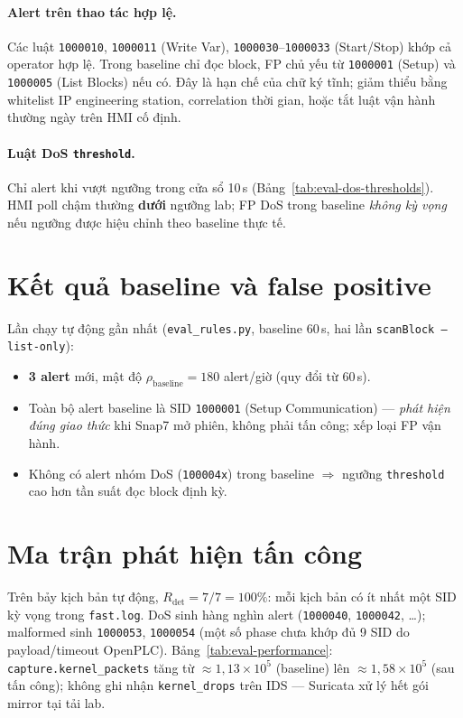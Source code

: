 \documentclass[../main.tex]{subfiles}
\begin{document}
\paragraph{Alert trên thao tác hợp lệ.}
Các luật \texttt{1000010}, \texttt{1000011} (Write Var), \texttt{1000030}--\texttt{1000033} (Start/Stop) khớp cả operator hợp lệ. Trong baseline chỉ đọc block, FP chủ yếu từ \texttt{1000001} (Setup) và \texttt{1000005} (List Blocks) nếu có. Đây là hạn chế của chữ ký tĩnh; giảm thiểu bằng whitelist IP engineering station, correlation thời gian, hoặc tắt luật vận hành thường ngày trên HMI cố định.

\paragraph{Luật DoS \texttt{threshold}.}
Chỉ alert khi vượt ngưỡng trong cửa sổ 10\,s (Bảng~\ref{tab:eval-dos-thresholds}). HMI poll chậm thường \textbf{dưới} ngưỡng lab; FP DoS trong baseline \emph{không kỳ vọng} nếu ngưỡng được hiệu chỉnh theo baseline thực tế.

\section{Kết quả baseline và false positive}
\label{sec:eval-fp}

Lần chạy tự động gần nhất (\texttt{eval\_rules.py}, baseline 60\,s, hai lần \texttt{scanBlock --list-only}):
\begin{itemize}
    \item \textbf{3 alert} mới, mật độ $\rho_{\mathrm{baseline}} = 180$ alert/giờ (quy đổi từ 60\,s).
    \item Toàn bộ alert baseline là SID \texttt{1000001} (Setup Communication) --- \emph{phát hiện đúng giao thức} khi Snap7 mở phiên, không phải tấn công; xếp loại FP vận hành.
    \item Không có alert nhóm DoS (\texttt{100004x}) trong baseline $\Rightarrow$ ngưỡng \texttt{threshold} cao hơn tần suất đọc block định kỳ.
\end{itemize}

\section{Ma trận phát hiện tấn công}
\label{sec:eval-detection}

Trên bảy kịch bản tự động, \textbf{$R_{\mathrm{det}} = 7/7 = 100\%$}: mỗi kịch bản có ít nhất một SID kỳ vọng trong \texttt{fast.log}. DoS sinh hàng nghìn alert (\texttt{1000040}, \texttt{1000042}, \ldots); malformed sinh \texttt{1000053}, \texttt{1000054} (một số phase chưa khớp đủ 9 SID do payload/timeout OpenPLC). Bảng~\ref{tab:eval-performance}: \texttt{capture.kernel\_packets} tăng từ $\approx 1{,}13 \times 10^5$ (baseline) lên $\approx 1{,}58 \times 10^5$ (sau tấn công); không ghi nhận \texttt{kernel\_drops} trên IDS --- Suricata xử lý hết gói mirror tại tải lab.
\end{document}
